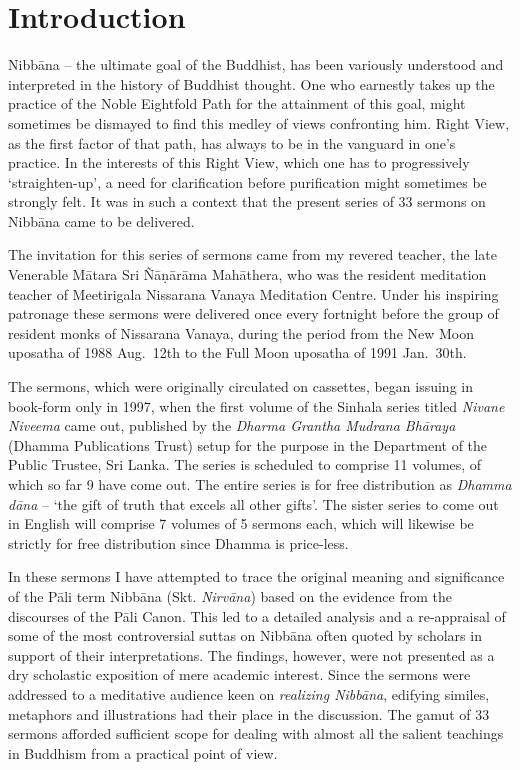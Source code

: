 \chapter{Introduction}

Nibbāna -- the ultimate goal of the Buddhist, has been variously understood and interpreted in the history of Buddhist thought. One who earnestly takes up the practice of the Noble Eightfold Path for the attainment of this goal, might sometimes be dismayed to find this medley of views confronting him. Right View, as the first factor of that path, has always to be in the vanguard in one's practice. In the interests of this Right View, which one has to progressively `straighten-up', a need for clarification before purification might sometimes be strongly felt. It was in such a context that the present series of 33 sermons on Nibbāna came to be delivered.

The invitation for this series of sermons came from my revered teacher, the late Venerable Mātara Sri Ñāṇārāma Mahāthera, who was the resident meditation teacher of Meetirigala Nissarana Vanaya Meditation Centre. Under his inspiring patronage these sermons were delivered once every fortnight before the group of resident monks of Nissarana Vanaya, during the period from the New Moon uposatha of 1988 Aug.~12th to the Full Moon uposatha of 1991 Jan.~30th.

The sermons, which were originally circulated on cassettes, began issuing in book-form only in 1997, when the first volume of the Sinhala series titled \emph{Nivane Niveema} came out, published by the \emph{Dharma Grantha Mudrana Bhāraya} (Dhamma Publications Trust) setup for the purpose in the Department of the Public Trustee, Sri Lanka. The series is scheduled to comprise 11 volumes, of which so far 9 have come out. The entire series is for free distribution as \emph{Dhamma dāna} -- `the gift of truth that excels all other gifts'. The sister series to come out in English will comprise 7 volumes of 5 sermons each, which will likewise be strictly for free distribution since Dhamma is price-less.

In these sermons I have attempted to trace the original meaning and significance of the Pāli term Nibbāna (Skt. \emph{Nirvāna}) based on the evidence from the discourses of the Pāli Canon. This led to a detailed analysis and a re-appraisal of some of the most controversial suttas on Nibbāna often quoted by scholars in support of their interpretations. The findings, however, were not presented as a dry scholastic exposition of mere academic interest. Since the sermons were addressed to a meditative audience keen on \emph{realizing Nibbāna}, edifying similes, metaphors and illustrations had their place in the discussion. The gamut of 33 sermons afforded sufficient scope for dealing with almost all the salient teachings in Buddhism from a practical point of view.

